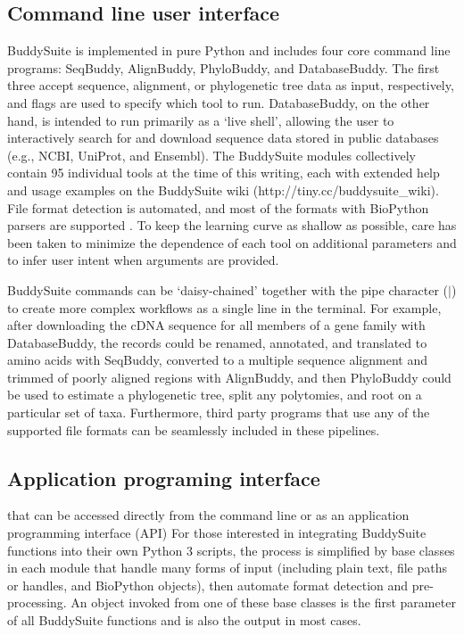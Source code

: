 \documentclass[twocolumn]{bmcart}%
\begin{document}
\subsection*{Command line user interface}
BuddySuite is implemented in pure Python and includes four core command line programs: SeqBuddy, AlignBuddy, PhyloBuddy, and DatabaseBuddy. The first three accept sequence, alignment, or phylogenetic tree data as input, respectively, and flags are used to specify which tool to run. DatabaseBuddy, on the other hand, is intended to run primarily as a `live shell', allowing the user to interactively search for and download sequence data stored in public databases (e.g., NCBI, UniProt, and Ensembl). The BuddySuite modules collectively contain 95 individual tools at the time of this writing, each with extended help and usage examples on the BuddySuite wiki (http://tiny.cc/buddysuite\_wiki). File format detection is automated, and most of the formats with BioPython parsers are supported \cite{Cock:2009hj}. To keep the learning curve as shallow as possible, care has been taken to minimize the dependence of each tool on additional parameters and to infer user intent when arguments are provided.

BuddySuite commands can be `daisy-chained' together with the pipe character ($\vert$) to create more complex workflows as a single line in the terminal. For example, after downloading the cDNA sequence for all members of a gene family with DatabaseBuddy, the records could be renamed, annotated, and translated to amino acids with SeqBuddy, converted to a multiple sequence alignment and trimmed of poorly aligned regions with AlignBuddy, and then PhyloBuddy could be used to estimate a phylogenetic tree, split any polytomies, and root on a particular set of taxa. Furthermore, third party programs that use any of the supported file formats can be seamlessly included in these pipelines.

\subsection*{Application programing interface}
that can be accessed directly from the command line or as an application programming interface (API)
For those interested in integrating BuddySuite functions into their own Python 3 scripts, the process is simplified by base classes in each module that handle many forms of input (including plain text, file paths or handles, and BioPython objects), then automate format detection and pre-processing. An object invoked from one of these base classes is the first parameter of all BuddySuite functions and is also the output in most cases.
\end{document}
